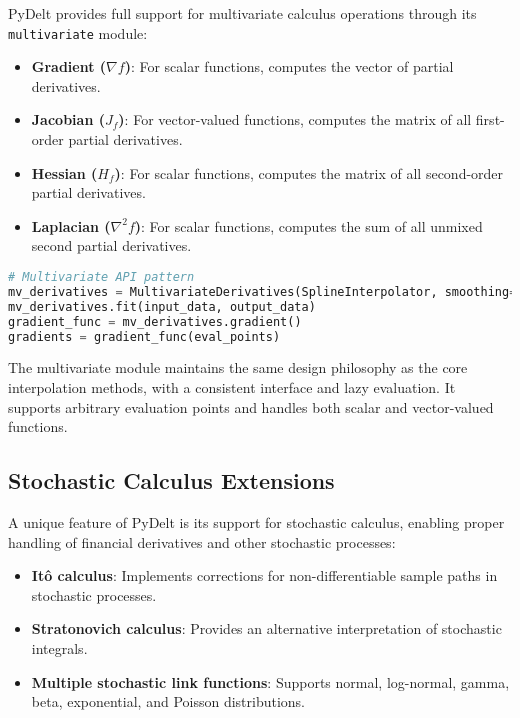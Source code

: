 \documentclass[11pt,a4paper]{article}
\begin{document}
PyDelt provides full support for multivariate calculus operations through its \texttt{multivariate} module:

\begin{itemize}
    \item \textbf{Gradient ($\nabla f$)}: For scalar functions, computes the vector of partial derivatives.
    \item \textbf{Jacobian ($J_f$)}: For vector-valued functions, computes the matrix of all first-order partial derivatives.
    \item \textbf{Hessian ($H_f$)}: For scalar functions, computes the matrix of all second-order partial derivatives.
    \item \textbf{Laplacian ($\nabla^2 f$)}: For scalar functions, computes the sum of all unmixed second partial derivatives.
\end{itemize}

\begin{lstlisting}[language=Python, caption=Multivariate calculus example]
# Multivariate API pattern
mv_derivatives = MultivariateDerivatives(SplineInterpolator, smoothing=0.1)
mv_derivatives.fit(input_data, output_data)
gradient_func = mv_derivatives.gradient()
gradients = gradient_func(eval_points)
\end{lstlisting}

The multivariate module maintains the same design philosophy as the core interpolation methods, with a consistent interface and lazy evaluation. It supports arbitrary evaluation points and handles both scalar and vector-valued functions.

\subsection{Stochastic Calculus Extensions}

A unique feature of PyDelt is its support for stochastic calculus, enabling proper handling of financial derivatives and other stochastic processes:

\begin{itemize}
    \item \textbf{Itô calculus}: Implements corrections for non-differentiable sample paths in stochastic processes.
    \item \textbf{Stratonovich calculus}: Provides an alternative interpretation of stochastic integrals.
    \item \textbf{Multiple stochastic link functions}: Supports normal, log-normal, gamma, beta, exponential, and Poisson distributions.
\end{itemize}
\end{document}

